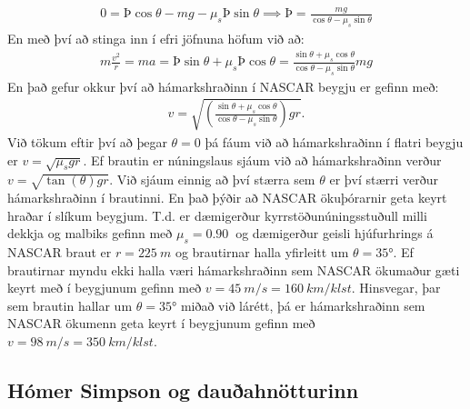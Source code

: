 \ifdefined \wholebook \else\documentclass[oneside]{book}\usepackage{EdlBook}\graphicspath{{figures/}}
\begin{document}
\begin{minipage}{\linewidth}
\begin{align*}
    0 = \text{Þ} \cos\theta - mg - \mu_s \text{Þ} \sin\theta \implies \text{Þ} = \frac{mg}{\cos\theta - \mu_s \sin\theta}
\end{align*}
En með því að stinga inn í efri jöfnuna höfum við að:
\begin{align*}
    m \frac{v^2}{r} = ma = \text{Þ} \sin\theta + \mu_s Þ \cos\theta = \frac{\sin\theta + \mu_s \cos\theta}{\cos\theta - \mu_s \sin\theta} mg
\end{align*}
En það gefur okkur því að hámarkshraðinn í NASCAR beygju er gefinn með:
\begin{align*}
    v = \sqrt{\left(\frac{\sin\theta + \mu_s \cos\theta}{\cos\theta - \mu_s \sin\theta}\right)gr}.
\end{align*}
Við tökum eftir því að þegar $\theta = 0$ þá fáum við að hámarkshraðinn í flatri beygju er $v = \sqrt{\mu_s gr}$. Ef brautin er núningslaus sjáum við að hámarkshraðinn verður $v = \sqrt{\tan(\theta) gr}$. Við sjáum einnig að því stærra sem $\theta$ er því stærri verður hámarkshraðinn í brautinni. En það þýðir að NASCAR ökuþórarnir geta keyrt hraðar í slíkum beygjum. T.d. er dæmigerður kyrrstöðunúningsstuðull milli dekkja og malbiks gefinn með $\mu_s = \SI{0.90}{}$ og dæmigerður geisli hjúfurhrings á NASCAR braut er $r = \SI{225}{m}$ og brautirnar halla yfirleitt um $\theta = \ang{35}$. Ef brautirnar myndu ekki halla væri hámarkshraðinn sem NASCAR ökumaður gæti keyrt með í beygjunum gefinn með $v = \SI{45}{m/s} = \SI{160}{km/klst}$. Hinsvegar, þar sem brautin hallar um $\theta = \ang{35}$ miðað við lárétt, þá er hámarkshraðinn sem NASCAR ökumenn geta keyrt í beygjunum gefinn með $v = \SI{98}{m/s} = \SI{350}{km/klst}$.  

\end{minipage}

\subsection*{Hómer Simpson og dauðahnötturinn}
\end{document}
